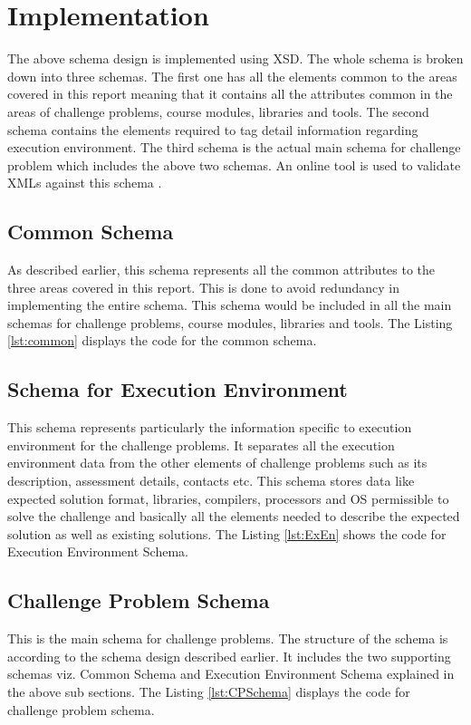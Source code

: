 \documentclass[11pt,letterpaper]{report}
\begin{document}
\section{Implementation}
The above schema design is implemented using XSD. The whole schema is broken down into three schemas. The first one has all the elements common to the areas covered in this report meaning that it contains all the attributes common in the areas of challenge problems, course modules, libraries and tools. The second schema contains the elements required to tag detail information regarding execution environment. The third schema is the actual main schema for challenge problem which includes the above two schemas. An online tool is used to validate XMLs against this schema \cite{olXSD}.

\subsection{Common Schema}
As described earlier, this schema represents all the common attributes to the three areas covered in this report. This is done to avoid redundancy in implementing the entire schema. This schema would be included in all the main schemas for challenge problems, course modules, libraries and tools. The Listing \ref{lst:common} displays the code for the common schema.     



\subsection{Schema for Execution Environment}
This schema represents particularly the information specific to execution environment for the challenge problems. It separates all the execution environment data from the other elements of challenge problems such as its description, assessment details, contacts etc. This schema stores data like expected solution format, libraries, compilers, processors and OS permissible to solve the challenge and basically all the elements needed to describe the expected solution as well as existing solutions. The Listing \ref{lst:ExEn} shows the code for Execution Environment Schema. 



\subsection{Challenge Problem Schema}
This is the main schema for challenge problems. The structure of the schema is according to the schema design described earlier. It includes the two supporting schemas viz. Common Schema and Execution Environment Schema explained in the above sub sections. The Listing \ref{lst:CPSchema} displays the code for challenge problem schema.
\end{document}
